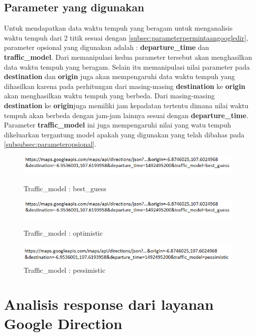 \subsection{Parameter yang digunakan}
\label{subsec:parameterrequestaplikasi}			

Untuk mendapatkan data waktu tempuh yang beragam untuk menganalisis waktu tempuh dari 2 titik sesuai dengan \ref{subsec:parameterpermintaangoogledir}, parameter opsional yang digunakan adalah :  \textbf{departure\_time} dan \textbf{traffic\_model}. Dari memanipulasi kedua parameter tersebut akan menghasilkan data waktu tempuh yang beragam. Selain itu memanipulasi nilai parameter pada \textbf{destination} dan  \textbf{origin} juga akan mempengaruhi data waktu tempuh yang dihasilkan karena pada perhitungan dari masing-masing \textbf{destination} ke \textbf{origin} akan menghasilkan waktu tempuh yang berbeda. Dari masing-masing \textbf{destination} ke \textbf{origin}juga memiliki jam kepadatan tertentu dimana nilai waktu tempuh akan berbeda dengan jam-jam lainnya sesuai dengan \textbf{departure\_time}. Parameter \textbf{traffic\_model} ini juga mempengaruhi nilai yang watu tempuh dikeluarkan tergantung model apakah yang digunakan yang telah dibahas pada \ref{subsubsec:parameteropsional}.

\begin{figure}[H]
				\centering		
				\includegraphics[scale=0.6]{Gambar/best_guess.png}
				\caption[Traffic\_model : best_guess]{Traffic\_model : best\_guess}
				\label{fig:best_guess}
					\includegraphics[scale=0.6]{Gambar/optimistic.png}
				\caption[Traffic\_model : optimistic]{Traffic\_model : optimistic}
				\label{fig:optimistic}
				\includegraphics[scale=0.6]{Gambar/pessimistic.png}
				\caption[Traffic\_model : pessimistic]{Traffic\_model : pessimistic}
				\label{fig:pessimistic}
			\end{figure}

\section{Analisis response dari layanan Google Direction}
\label{sec:analisisresponsegoogledir}

